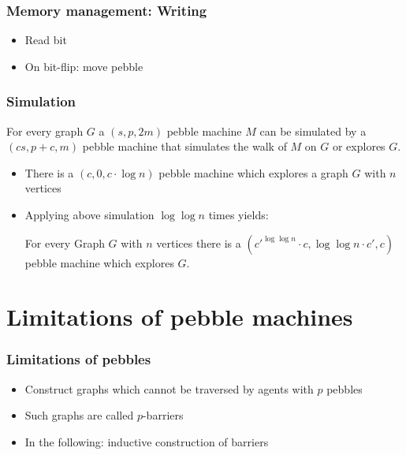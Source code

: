 \documentclass{beamer}
\begin{document}
\begin{frame}
  \frametitle{Memory management: Writing}
  \begin{itemize}
    \item Read bit
    \item On bit-flip: move pebble
  \end{itemize}
\end{frame}

\begin{frame}
  \frametitle{Simulation}
  \begin{theorem}
    For every graph $G$ a $(s,p,2m)$ pebble machine $M$ can be simulated by a
    $(cs,p+c,m)$ pebble machine that simulates the walk of $M$ on $G$ or
    explores $G$.
  \end{theorem}
  \begin{itemize}
    \item There is a $(c,0,c\cdot\log n)$ pebble machine which explores
      a graph $G$ with $n$ vertices
    \item Applying above simulation $\log \log n$ times yields:
      \begin{theorem}
        For every Graph $G$ with $n$ vertices there is a
        $(c'^{\log\log n}\cdot c, \log\log n\cdot c', c)$ pebble machine
        which explores $G$.
      \end{theorem}
  \end{itemize}
\end{frame}

\section{Limitations of pebble machines}
\begin{frame}
  \frametitle{Limitations of pebbles}
  \begin{itemize}
    \item Construct graphs which cannot be traversed by agents with $p$ pebbles
    \item Such graphs are called $p$-barriers
      \begin{center}
        \resizebox{0.3\textwidth}{!}{}
      \end{center}
    \item In the following: inductive construction of barriers
  \end{itemize}
\end{frame}
\end{document}
